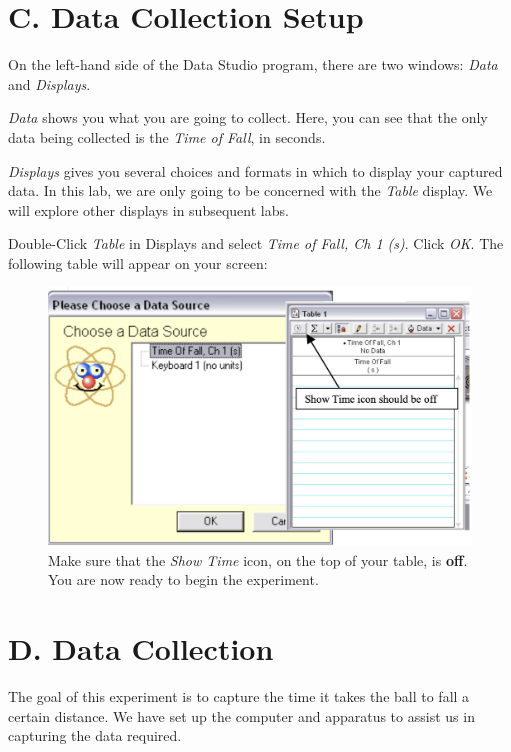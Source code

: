 \section{C. Data Collection Setup}

On the left-hand side of the Data Studio program, there are two windows: \emph{Data}
and \emph{Displays}. 

\emph{Data} shows you what you are going to collect. Here, you can see that the only 
data being collected is the \emph{Time of Fall}, in seconds.

\emph{Displays} gives you several choices and formats in which to display your captured 
data. In this lab, we are only going to be concerned with the \emph{Table} display.
We will explore other displays in subsequent labs.

Double-Click \emph{Table} in Displays and select \emph{Time of Fall, Ch 1 (s)}. Click \emph{OK}. 
The following table will appear on your screen:


\begin{figure}[ht]
  \centerline{\includegraphics[scale=0.4]{resources/photo6.jpg}}
  \caption{Make sure that the \emph{Show Time} icon, on the top of your table, is \textbf{off}. 
  You are now ready to begin the experiment.}
  \label{3.3}
\end{figure}

\section{D. Data Collection}

  The goal of this experiment is to capture the time it takes the ball to fall a certain distance.
We have set up the computer and apparatus to assist us in capturing the data required.


